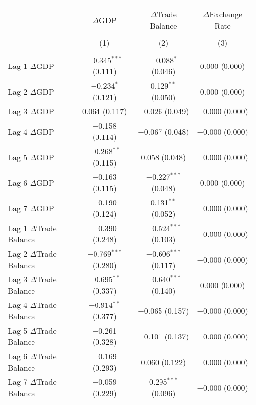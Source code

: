 \documentclass[
]{article}
\let\oldtable\table
\let\endoldtable\endtable
\renewenvironment{table}[1][H]{\oldtable[H]}{\endoldtable}
\begin{document}
\begin{table}[!htbp] \centering 
  \caption{\textsc{Vector Autoregression OLS Model Estimates of GDP, Trade Balance, and Exchange Rate} }
  \label{tab:var_results} 
\small 
\begin{tabular}{@{\extracolsep{5pt}}lccc} 
\\[-1.8ex]\hline 
\hline \\[-1.8ex] 
 & $\Delta$GDP & $\Delta$Trade Balance & $\Delta$Exchange Rate \\ 
\\[-1.8ex] & (1) & (2) & (3)\\ 
\hline \\[-1.8ex] 
 Lag 1 $\Delta$GDP & $-$0.345$^{***}$ (0.111) & $-$0.088$^{*}$ (0.046) & 0.000 (0.000) \\[1.2ex]  
  Lag 2 $\Delta$GDP & $-$0.234$^{*}$ (0.121) & 0.129$^{**}$ (0.050) & 0.000 (0.000) \\[1.2ex]  
  Lag 3 $\Delta$GDP & 0.064 (0.117) & $-$0.026 (0.049) & $-$0.000 (0.000) \\[1.2ex]  
  Lag 4 $\Delta$GDP & $-$0.158 (0.114) & $-$0.067 (0.048) & $-$0.000 (0.000) \\[1.2ex]  
  Lag 5 $\Delta$GDP & $-$0.268$^{**}$ (0.115) & 0.058 (0.048) & $-$0.000 (0.000) \\[1.2ex]  
  Lag 6 $\Delta$GDP & $-$0.163 (0.115) & $-$0.227$^{***}$ (0.048) & 0.000 (0.000) \\[1.2ex]  
  Lag 7 $\Delta$GDP & $-$0.190 (0.124) & 0.131$^{**}$ (0.052) & $-$0.000 (0.000) \\[1.2ex]  
  Lag 1 $\Delta$Trade Balance & $-$0.390 (0.248) & $-$0.524$^{***}$ (0.103) & $-$0.000 (0.000) \\[1.2ex]  
  Lag 2 $\Delta$Trade Balance & $-$0.769$^{***}$ (0.280) & $-$0.606$^{***}$ (0.117) & $-$0.000 (0.000) \\[1.2ex]  
  Lag 3 $\Delta$Trade Balance & $-$0.695$^{**}$ (0.337) & $-$0.640$^{***}$ (0.140) & 0.000 (0.000) \\[1.2ex]  
  Lag 4 $\Delta$Trade Balance & $-$0.914$^{**}$ (0.377) & $-$0.065 (0.157) & $-$0.000 (0.000) \\[1.2ex]  
  Lag 5 $\Delta$Trade Balance & $-$0.261 (0.328) & $-$0.101 (0.137) & $-$0.000 (0.000) \\[1.2ex]  
  Lag 6 $\Delta$Trade Balance & $-$0.169 (0.293) & 0.060 (0.122) & $-$0.000 (0.000) \\[1.2ex]  
  Lag 7 $\Delta$Trade Balance & $-$0.059 (0.229) & 0.295$^{***}$ (0.096) & $-$0.000 (0.000) \\[1.2ex]  

\end{tabular}
\end{table}
\end{document}
